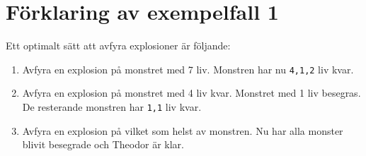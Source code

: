 \section*{Förklaring av exempelfall 1}
Ett optimalt sätt att avfyra explosioner är följande:
\begin{enumerate}
  \item Avfyra en explosion på monstret med 7 liv. Monstren har nu \verb+4,1,2+ liv kvar.
  \item Avfyra en explosion på monstret med 4 liv kvar. Monstret med 1 liv besegras.
  De resterande monstren har \verb+1,1+ liv kvar.
  \item Avfyra en explosion på vilket som helst av monstren. Nu har alla monster blivit besegrade och Theodor är klar.
\end{enumerate}
